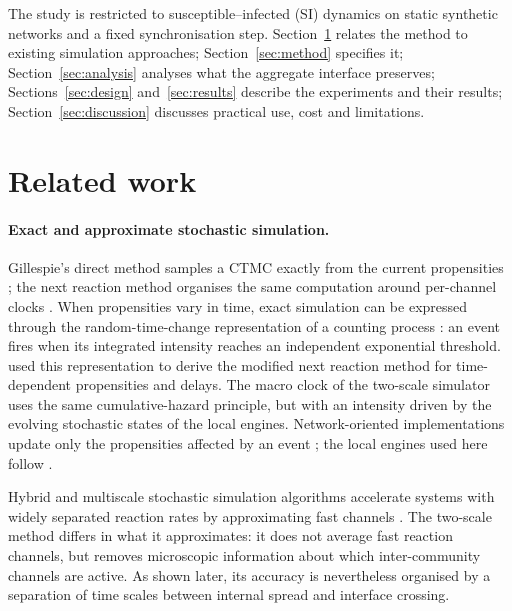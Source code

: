 \documentclass[a4paper,fleqn]{cas-sc}
\begin{document}
The study is restricted to susceptible--infected (SI) dynamics on static synthetic networks and a fixed synchronisation step. Section~\ref{sec:related} relates the method to existing simulation approaches; Section~\ref{sec:method} specifies it; Section~\ref{sec:analysis} analyses what the aggregate interface preserves; Sections~\ref{sec:design} and~\ref{sec:results} describe the experiments and their results; Section~\ref{sec:discussion} discusses practical use, cost and limitations.

\section{Related work}
\label{sec:related}

\paragraph{Exact and approximate stochastic simulation.}
Gillespie's direct method samples a CTMC exactly from the current propensities \citep{gillespie1977exact}; the next reaction method organises the same computation around per-channel clocks \citep{gibson2000}. When propensities vary in time, exact simulation can be expressed through the random-time-change representation of a counting process \citep{ethier1986}: an event fires when its integrated intensity reaches an independent exponential threshold. \citet{anderson2007} used this representation to derive the modified next reaction method for time-dependent propensities and delays. The macro clock of the two-scale simulator uses the same cumulative-hazard principle, but with an intensity driven by the evolving stochastic states of the local engines. Network-oriented implementations update only the propensities affected by an event \citep{vestergaard2015,kuryliak2025simulating}; the local engines used here follow \citet{kuryliak2025simulating}.

Hybrid and multiscale stochastic simulation algorithms accelerate systems with widely separated reaction rates by approximating fast channels \citep{haseltine2002,cao2005slow}. The two-scale method differs in what it approximates: it does not average fast reaction channels, but removes microscopic information about which inter-community channels are active. As shown later, its accuracy is nevertheless organised by a separation of time scales between internal spread and interface crossing.
\end{document}
